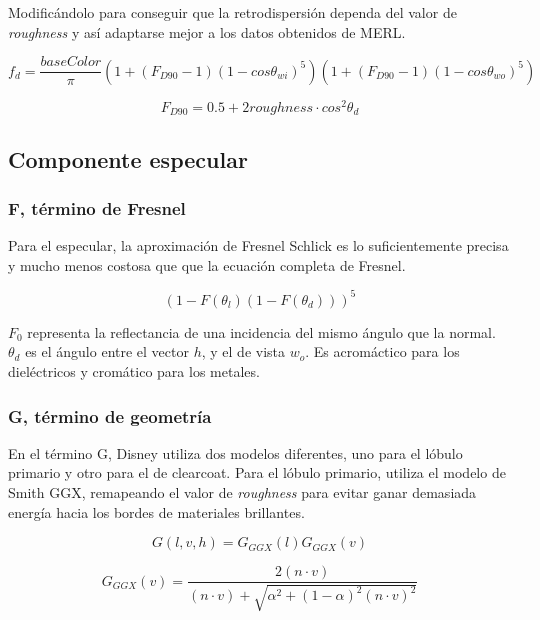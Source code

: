     Modific\'andolo para conseguir que la retrodispersi\'on dependa del valor de \textit{roughness} y as\'i
    adaptarse mejor a los datos obtenidos de MERL.

    \begin{equation}
    f_d = \frac{baseColor}{\pi}
    \left(  1 + (F_{D90} - 1)(1 - cos\theta_{wi})^5  \right)
    \left(  1 + (F_{D90} - 1)(1 - cos\theta_{wo})^5  \right)
    \end{equation}
    
    $$
    F_{D90} = 0.5 + 2roughness\cdot{cos^2\theta_d}
    $$

    \subsection{Componente especular}
        \subsubsection{F, t\'ermino de Fresnel}
            Para el especular, la aproximaci\'on de Fresnel Schlick es lo suficientemente precisa y mucho menos costosa que
            que la ecuaci\'on completa de Fresnel.

            \begin{equation}
            (1 - F(\theta_l) (1 - F(\theta_d)))^5
            \end{equation}

            $F_0$ representa la reflectancia de una incidencia del mismo \'angulo que la normal. $\theta_d$ es el \'angulo
            entre el vector $h$, y el de vista $w_o$. Es acrom\'actico para los diel\'ectricos y crom\'atico para los metales.

        \subsubsection{G, t\'ermino de geometr\'ia}
            En el t\'ermino G, Disney utiliza dos modelos diferentes, uno para el l\'obulo primario y otro para el de clearcoat.
            Para el l\'obulo primario, utiliza el modelo de Smith GGX, remapeando el valor de \textit{roughness} para evitar
            ganar demasiada energ\'ia hacia los bordes de materiales brillantes.

            $$
            G(l, v, h) = G_{GGX}(l)G_{GGX}(v)
            $$

            $$
            G_{GGX}(v) = \frac
            {2 (n \cdot{v})}
            {(n \cdot{v}) + \sqrt{ \alpha^2 + (1 - \alpha)^2 (n \cdot{v})^2 }}
            $$

